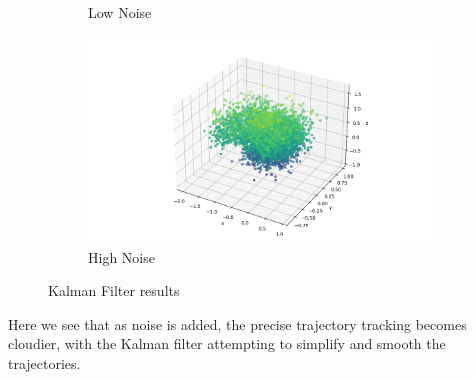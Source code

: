 \documentclass{article}
\begin{document}
\begin{figure}[H]
\begin{subfigure}{0.45\textwidth}
        \caption{Low Noise}
    \end{subfigure}
    \begin{subfigure}{0.45\textwidth}
        \includegraphics[width=\textwidth]{imgs/task2_high_noise.png}
        \caption{High Noise}
    \end{subfigure}
    \caption{Kalman Filter results}
\end{figure}

Here we see that as noise is added, the precise trajectory tracking becomes cloudier, with the Kalman filter attempting to simplify and smooth the trajectories.
\end{document}
